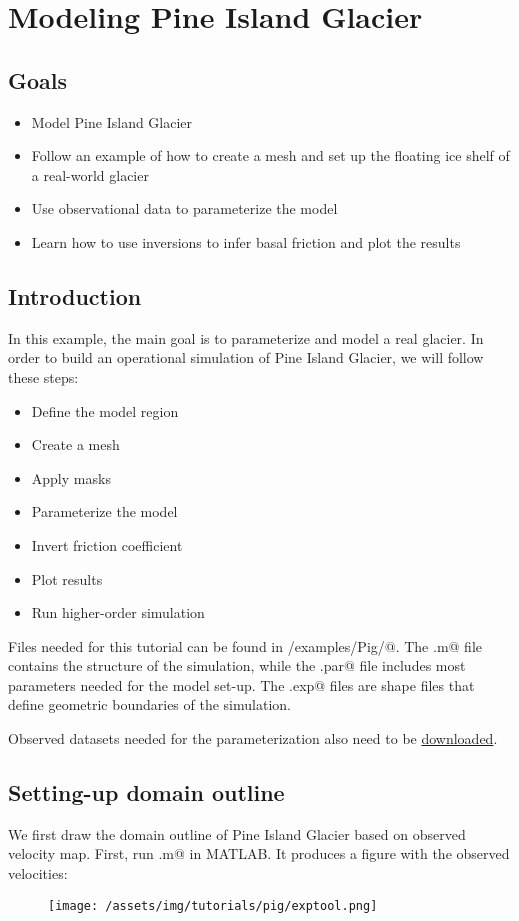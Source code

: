 \section{Modeling Pine Island Glacier}
\subsection{Goals} %
\begin{itemize}
	\item Model Pine Island Glacier
	\item Follow an example of how to create a mesh and set up the floating ice shelf of a real-world glacier
	\item Use observational data to parameterize the model
	\item Learn how to use inversions to infer basal friction and plot the results
\end{itemize}
\subsection{Introduction}%
In this example, the main goal is to parameterize and model a real glacier. In order to build an operational simulation of Pine Island Glacier, we will follow these steps:
\begin{itemize}
	\item Define the model region
	\item Create a mesh
	\item Apply masks
	\item Parameterize the model
	\item Invert friction coefficient
	\item Plot results
	\item Run higher-order simulation
\end{itemize}

Files needed for this tutorial can be found in \verb@trunk/examples/Pig/@. The \verb@runme.m@ file contains the structure of the simulation, while the \verb@.par@ file includes most parameters needed for the model set-up. The \verb@.exp@ files are shape files that define geometric boundaries of the simulation.

Observed datasets needed for the parameterization also need to be \href{https://issm.jpl.nasa.gov/documentation/tutorials/datasets/}{downloaded}.
\subsection{Setting-up domain outline} %
We first draw the domain outline of Pine Island Glacier based on observed velocity map. First, run \verb@PigRegion.m@ in MATLAB. It produces a figure with the observed velocities:
\begin{figure}[H]
	\begin{center}
		\texttt{[image: /assets/img/tutorials/pig/exptool.png]}
	\end{center}
\end{figure}

